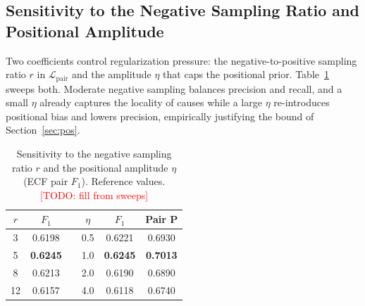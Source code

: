 \documentclass[journal]{IEEEtran}
\newcommand{\todo}[1]{\textcolor{red}{[TODO: #1]}}
\begin{document}
\subsection{Sensitivity to the Negative Sampling Ratio and Positional Amplitude}
Two coefficients control regularization pressure: the negative-to-positive sampling ratio $r$
in $\mathcal{L}_{\mathrm{pair}}$ and the amplitude $\eta$ that caps the positional prior.
Table~\ref{tab:sensitivity} sweeps both. Moderate negative sampling balances precision and
recall, and a small $\eta$ already captures the locality of causes while a large $\eta$
re-introduces positional bias and lowers precision, empirically justifying the bound of
Section~\ref{sec:pos}. %
\begin{table}[t]
\centering
\caption{Sensitivity to the negative sampling ratio $r$ and the positional amplitude $\eta$
(ECF pair $F_1$). Reference values. \todo{fill from sweeps}}
\label{tab:sensitivity}
\setlength{\tabcolsep}{5pt}
\begin{tabular}{cccccc}
\toprule
$r$ & $F_1$ & & $\eta$ & $F_1$ & Pair P \\
\midrule
3  & 0.6198 & & 0.5 & 0.6221 & 0.6930 \\
5  & \textbf{0.6245} & & 1.0 & \textbf{0.6245} & \textbf{0.7013} \\
8  & 0.6213 & & 2.0 & 0.6190 & 0.6890 \\
12 & 0.6157 & & 4.0 & 0.6118 & 0.6740 \\
\bottomrule
\end{tabular}
\end{table}
\end{document}
